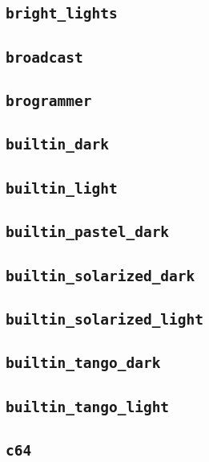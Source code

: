 \subsection{\texttt{bright\_lights}}
\newpage
\subsection{\texttt{broadcast}}
\newpage
\subsection{\texttt{brogrammer}}
\newpage
\subsection{\texttt{builtin\_dark}}
\newpage
\subsection{\texttt{builtin\_light}}
\newpage
\subsection{\texttt{builtin\_pastel\_dark}}
\newpage
\subsection{\texttt{builtin\_solarized\_dark}}
\newpage
\subsection{\texttt{builtin\_solarized\_light}}
\newpage
\subsection{\texttt{builtin\_tango\_dark}}
\newpage
\subsection{\texttt{builtin\_tango\_light}}
\newpage
\subsection{\texttt{c64}}
\newpage
